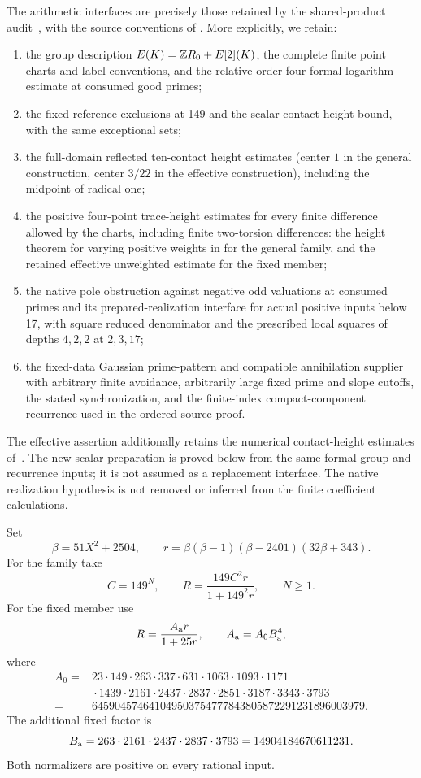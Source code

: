 \documentclass[11pt]{article}
\theoremstyle{remark}\newtheorem{remark}[theorem]{Remark}
\begin{document}
The arithmetic interfaces are precisely those retained by the
shared-product audit~\cite{Shared}, with the source conventions of
\cite{General,Effective}. More explicitly, we retain:
\begin{enumerate}
\item the group description $E(K)=\mathbb Z R_0+E[2](K)$, the complete
finite point charts and label conventions, and the relative
order-four formal-logarithm estimate at consumed good primes;
\item the fixed reference exclusions at 149 and the scalar
contact-height bound, with the same exceptional sets;
\item the full-domain reflected ten-contact height estimates
(center $1$ in the general construction, center $3/22$ in the
effective construction), including the midpoint of radical one;
\item the positive four-point trace-height estimates for every finite
difference allowed by the charts, including finite two-torsion
differences: the height theorem for varying positive weights in
\cite{Weighted} for the general family, and the retained effective
unweighted estimate for the fixed member;
\item the native pole obstruction against negative odd valuations
at consumed primes and its prepared-realization interface for
actual positive inputs below 17, with square reduced denominator
and the prescribed local squares of depths $4,2,2$ at $2,3,17$;
\item the fixed-data Gaussian prime-pattern and compatible
annihilation supplier with arbitrary finite avoidance, arbitrarily
large fixed prime and slope cutoffs, the stated synchronization,
and the finite-index compact-component recurrence used in the
ordered source proof.
\end{enumerate}
The effective assertion additionally retains the numerical
contact-height estimates of~\cite{Effective}. The new scalar
preparation is proved below from the same formal-group and
recurrence inputs; it is not assumed as a replacement interface.
The native realization hypothesis is not removed or inferred from
the finite coefficient calculations.

Set
\[
 \beta=51X^2+2504,\qquad
 r=\beta(\beta-1)(\beta-2401)(32\beta+343).
\]
For the family take
\begin{equation}\label{eq:Rfamily}
 C=149^N,\qquad R=\frac{149C^2r}{1+149^2r},\qquad N\ge1.
\end{equation}
For the fixed member use
\begin{equation}\label{eq:Rfixed}
 R=\frac{A_{\rm a}r}{1+25r},\qquad A_{\rm a}=A_0B_{\rm a}^4,
\end{equation}
where
\begin{align*}
 A_0={}&23\cdot149\cdot263\cdot337\cdot631\cdot1063\cdot1093
 \cdot1171\\
 &{}\cdot1439\cdot2161\cdot2437\cdot2837\cdot2851\cdot3187
 \cdot3343\cdot3793\\
 ={}&645904574641049503754777843805872291231896003979.
\end{align*}
The additional fixed factor is
\[
 B_{\rm a}=263\cdot2161\cdot2437\cdot2837\cdot3793
          =14904184670611231.
\]
Both normalizers are positive on every rational input.
\end{document}

